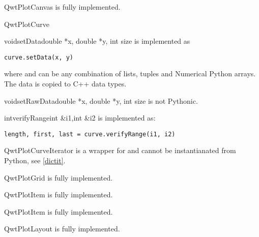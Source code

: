 \documentclass{manual}
\begin{document}
\begin{classdesc*}{QwtPlotCanvas}
  is fully implemented.
\end{classdesc*}

\begin{classdesc*}{QwtPlotCurve}

  \begin{cfuncdesc}{void}{setData}{double *x, double *y, int size}
    is implemented as
    \begin{verbatim}
curve.setData(x, y)
    \end{verbatim}
    where  and  can be any combination of lists, tuples and
    Numerical Python arrays.  The data is copied to C++ data types.
  \end{cfuncdesc}

  \begin{cfuncdesc}{void}{setRawData}{double *x, double *y, int size}
      is not Pythonic.
  \end{cfuncdesc}

  \begin{cfuncdesc}{int}{verifyRange}{int \&i1,int \&i2}
    is implemented as:
    \begin{verbatim}
length, first, last = curve.verifyRange(i1, i2)
    \end{verbatim}
  \end{cfuncdesc}

\end{classdesc*}

\begin{classdesc*}{QwtPlotCurveIterator}
  is a wrapper for  and cannot be instantianated
  from Python, see \ref{dictit}.
\end{classdesc*}

\begin{classdesc*}{QwtPlotGrid}
  is fully implemented.
\end{classdesc*}

\begin{classdesc*}{QwtPlotItem}
  is fully implemented.
\end{classdesc*}

\begin{classdesc*}{QwtPlotItem}
  is fully implemented.
\end{classdesc*}

\begin{classdesc*}{QwtPlotLayout}
  is fully implemented.
\end{classdesc*}
\end{document}
